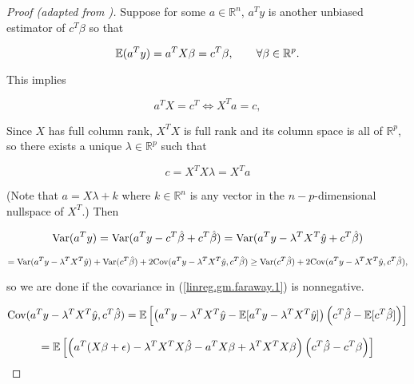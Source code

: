 \begin{proof}[Proof (adapted from \citet{faraway2002})]

Suppose for some \(a \in \mathbb{R}^n\), \(a^Ty\) is another unbiased estimator of \( c^T\beta\) so that

\[
\mathbb{E}(a^Ty) = a^TX \beta = c^T\beta, \qquad \forall \beta \in \mathbb{R}^p.
\]

This implies 

\begin{equation}
a^TX = c^T \iff X^T a = c,
\end{equation}

Since \(X\) has full column rank, \(X^TX\) is full rank and its column space is all of \(\mathbb{R}^p\), so there exists a unique \(\lambda \in \mathbb{R}^p\) such that

\begin{equation}\label{linreg.gm.faraway.2}
c = X^TX \lambda = X^Ta
\end{equation}

%
%
%


(Note that \(a = X \lambda + k\) where \(k \in \mathbb{R}^n\) is any vector in the \(n - p\)-dimensional nullspace of \(X^T\).) Then

\[
\mathrm{Var}(a^Ty) = \mathrm{Var}( a^Ty - c^T \hat{\beta} + c^T \hat{\beta}) = \mathrm{Var}( a^Ty - \lambda^T X^T \hat{y} + c^T \hat{\beta}) 
\]

\begin{equation}\label{linreg.gm.faraway.1}
= \mathrm{Var}( a^Ty - \lambda^T X^T \hat{y}) + \mathrm{Var}(c^T \hat{\beta})  + 2 \mathrm{Cov} (a^Ty - \lambda^T X^T \hat{y}, c^T \hat{\beta}) \geq \mathrm{Var}(c^T \hat{\beta})  + 2 \mathrm{Cov} (a^Ty - \lambda^T X^T \hat{y}, c^T \hat{\beta}),
\end{equation}

so we are done if the covariance in (\ref{linreg.gm.faraway.1}) is nonnegative.

\[
\mathrm{Cov} (a^Ty - \lambda^T X^T \hat{y}, c^T \hat{\beta}) = \mathbb{E} \left[ \left( a^Ty - \lambda^T X^T \hat{y} - \mathbb{E}[ a^Ty - \lambda^T X^T \hat{y}] \right) \left(c^T \hat{\beta} - \mathbb{E}[ c^T \hat{\beta}] \right)  \right]
\]

\[
= \mathbb{E} \left[ \left( a^T(X \beta + \epsilon) - \lambda^T X^T X \hat{\beta} -  a^TX \beta + \lambda^T X^T X \beta \right) \left(c^T \hat{\beta} - c^T \beta \right)  \right]
\]


\end{proof}
